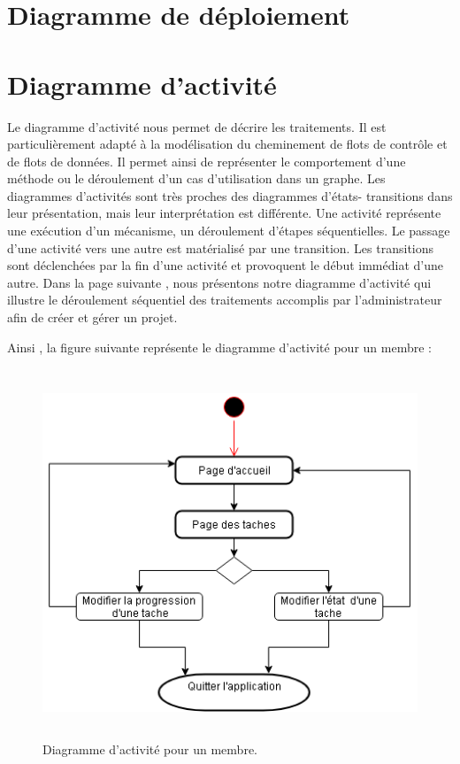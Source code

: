 \newpage 



\section{Diagramme de d\'{e}ploiement }



\section{Diagramme d'activit\'{e}}
Le diagramme d'activit\'{e} nous permet de d\'{e}crire les traitements. Il est
particuli\`{e}rement adapt\'{e} \`{a} la mod\'{e}lisation du cheminement de flots de
contr\^{o}le et de flots de donn\'{e}es. Il permet ainsi de repr\'{e}senter le
comportement d'une m\'{e}thode ou le d\'{e}roulement d'un cas d'utilisation dans
un graphe.
Les diagrammes d'activit\'{e}s sont tr\`{e}s proches des diagrammes d'\'{e}tats-
transitions dans leur pr\'{e}sentation, mais leur interpr\'{e}tation est diff\'{e}rente.
Une activit\'{e} repr\'{e}sente une ex\'{e}cution d'un m\'{e}canisme, un d\'{e}roulement
d'\'{e}tapes s\'{e}quentielles. Le passage d'une activit\'{e} vers une autre est mat\'{e}rialis\'{e}
par une transition.
Les transitions sont d\'{e}clench\'{e}es par la fin d'une activit\'{e} et provoquent le
d\'{e}but imm\'{e}diat d'une autre.
Dans la page suivante , nous pr\'{e}sentons notre diagramme d'activit\'{e} qui illustre le
d\'{e}roulement s\'{e}quentiel des traitements accomplis par l'administrateur afin de
cr\'{e}er et g\'{e}rer un projet.



Ainsi , la figure suivante représente le diagramme d'activit\'{e} pour un membre :
\begin{figure}[H]
\center
\includegraphics[width=13cm,height=11cm]{./figures/activity_m.png}
\caption{Diagramme d'activit\'{e} pour un membre.}

\end{figure}
\FloatBarrier



